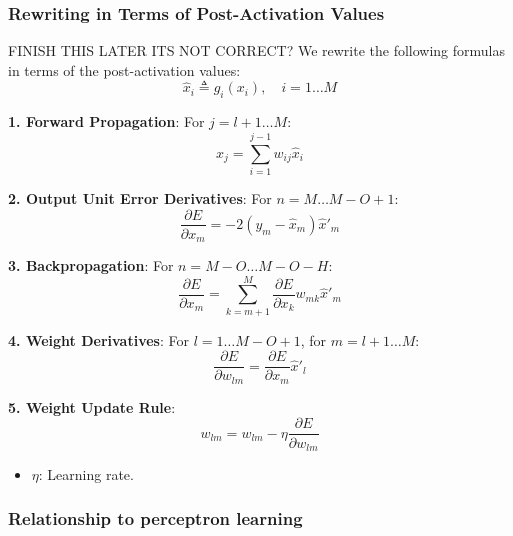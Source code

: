 \subsubsection{Rewriting in Terms of Post-Activation Values}
\begin{derivation} FINISH THIS LATER ITS NOT CORRECT?
    We rewrite the following formulas in terms of the post-activation values:
    \[
    \hat{x}_i \triangleq g_i(x_i), \quad i = 1 \dots M
    \]
    
    \textbf{1. Forward Propagation}:
    For $j = l+1 \dots M$:
    \[
    x_j = \sum_{i=1}^{j-1} w_{ij} \hat{x}_i
    \]
    
    \textbf{2. Output Unit Error Derivatives}:
    For $n = M \dots M-O+1$:
    \[
    \frac{\partial E}{\partial x_m} = -2(y_m - \hat{x}_m) \hat{x}'_m
    \]
    
    \textbf{3. Backpropagation}:
    For $n = M-O \dots M-O-H$:
    \[
    \frac{\partial E}{\partial x_m} = \sum_{k=m+1}^{M} \frac{\partial E}{\partial x_k} w_{mk} \hat{x}'_m
    \]
    
    \textbf{4. Weight Derivatives}:
    For $l = 1 \dots M-O+1$, for $m = l+1 \dots M$:
    \[
    \frac{\partial E}{\partial w_{lm}} = \frac{\partial E}{\partial x_m} \hat{x}'_l
    \]
    
    \textbf{5. Weight Update Rule}:
    \[
    w_{lm} = w_{lm} - \eta \frac{\partial E}{\partial w_{lm}}
    \]
    
    \begin{itemize}
        \item $\eta$: Learning rate.
    \end{itemize}

\end{derivation}

\subsubsection{Relationship to perceptron learning}
\begin{intuition}
\end{intuition}

